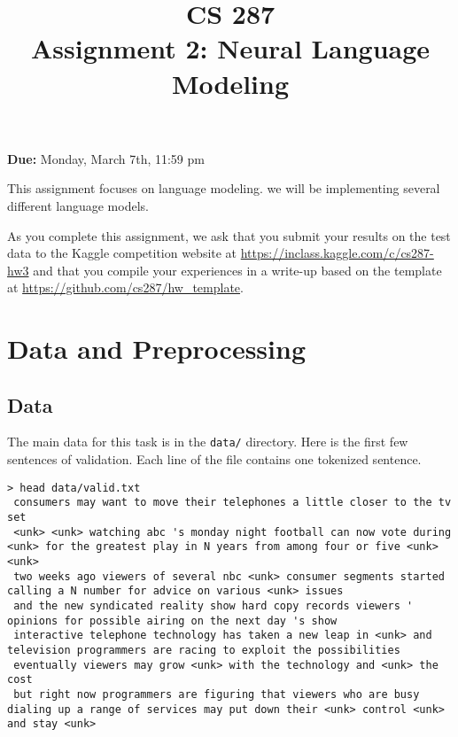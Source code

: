 \documentclass[11pt]{article}
\title{CS 287 \\ Assignment 2: Neural Language Modeling }
\date{}
\begin{document}
\maketitle{}

\begin{center}
  \textbf{Due:} Monday, March 7th, 11:59 pm 
\end{center}


This assignment focuses on language modeling. 
 we will be implementing several different 
language models. \cite{DBLP:journals/jmlr/BengioDVJ03}



As you complete this assignment, we ask that you submit your results
on the test data to the Kaggle competition website at
\url{https://inclass.kaggle.com/c/cs287-hw3} and that you compile your
experiences in a write-up based on the template at
\url{https://github.com/cs287/hw_template}.

\section{Data and Preprocessing}

\subsection{Data}

The main data for this task is in the \texttt{data/} directory. Here
is the first few sentences of validation. Each line of the file
contains one tokenized sentence.

\lstset{breaklines=true}
\begin{lstlisting}
> head data/valid.txt 
 consumers may want to move their telephones a little closer to the tv set 
 <unk> <unk> watching abc 's monday night football can now vote during <unk> for the greatest play in N years from among four or five <unk> <unk> 
 two weeks ago viewers of several nbc <unk> consumer segments started calling a N number for advice on various <unk> issues 
 and the new syndicated reality show hard copy records viewers ' opinions for possible airing on the next day 's show 
 interactive telephone technology has taken a new leap in <unk> and television programmers are racing to exploit the possibilities 
 eventually viewers may grow <unk> with the technology and <unk> the cost 
 but right now programmers are figuring that viewers who are busy dialing up a range of services may put down their <unk> control <unk> and stay <unk> 

\end{lstlisting}
\end{document}
